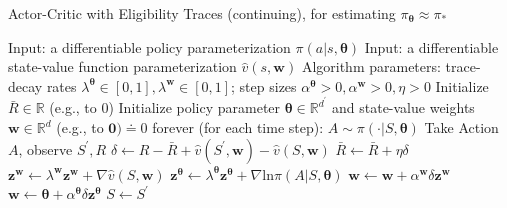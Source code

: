 \documentclass[12pt,a4paper]{article}
\begin{document}
\begin{algorithm}
	\caption{Actor-Critic with Eligibility Traces (continuing), for estimating $\pi_{\bm{\theta}} \approx \pi_{*}$}
	\begin{algorithmic}                                                                                                   
		\State Input: a differentiable policy parameterization $\pi(a|s, \bm{\theta})$
		\State Input: a differentiable state-value function parameterization $\hat{v}(s, \mathbf{w})$
		\State Algorithm parameters: trace-decay rates $\lambda^{\bm{\theta}} \in [0, 1], \lambda^{\mathbf{w}} \in [0,1]$; step sizes $\alpha^{\bm{\theta}} > 0, \alpha^{\mathbf{w}} > 0, \eta > 0$
		\State Initialize $\bar{R} \in \mathbb{R}$ (e.g., to 0)
		\State Initialize policy parameter $\bm{\theta} \in \mathbb{R}^{d^{'}}$ and state-value weights $\mathbf{w} \in \mathbb{R}^{d}$ (e.g., to $\mathbf{0}) \doteq 0$
		\Loop \quad forever (for each time step):
			\State $A \sim \pi(\cdot|S, \bm{\theta})$
			\State Take Action $A$, observe $S^{'}, R$
			\State $\delta \leftarrow R - \bar{R} + \hat{v}(S^{'}, \mathbf{w}) - \hat{v}(S, \mathbf{w})$
			\State $\bar{R} \leftarrow \bar{R} + \eta\delta$
			\State $\mathbf{z}^{\mathbf{w}} \leftarrow \lambda^{\mathbf{w}}\mathbf{z}^{\mathbf{w}} + \nabla\hat{v}(S, \mathbf{w})$
			\State $\mathbf{z}^{\bm{\theta}} \leftarrow \lambda^{\bm{\theta}}\mathbf{z}^{\bm{\theta}} + \nabla \text{ln}\pi(A|S, \bm{\theta})$
			\State $\mathbf{w} \leftarrow \mathbf{w} + \alpha^{\mathbf{w}}\delta\mathbf{z}^{\mathbf{w}}$
			\State $\mathbf{w} \leftarrow \bm{\theta} + \alpha^{\bm{\theta}}\delta\mathbf{z}^{\bm{\theta}}$
			\State $S \leftarrow S^{'}$
		\EndLoop
	\end{algorithmic}
\end{algorithm} 


\end{document}
